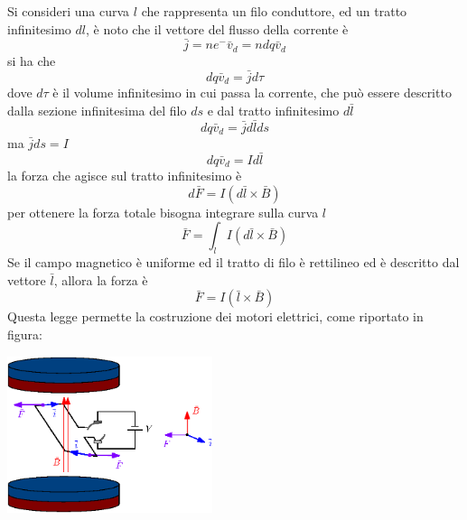 \documentclass[10pt, letterpaper]{report}
\begin{document}
Si consideri una curva $l$ che rappresenta un filo conduttore, ed un tratto infinitesimo $d l$, è noto che il vettore del flusso della corrente è 
$$ \bar j =ne^-\bar v_d= ndq\bar v_d$$
si ha che 
$$ dq\bar v_d=\bar jd\tau$$
dove $d\tau$ è il volume infinitesimo in cui passa la corrente, che può essere descritto dalla sezione infinitesima del filo $ds$ e dal tratto infinitesimo $d\bar l$ 
$$dq\bar v_d=\bar j d\bar lds $$
ma $\bar j ds =I$
$$ dq\bar v_d=Id\bar l$$
la forza che agisce sul tratto infinitesimo è 
$$ d\bar F =I(d\bar l\times \bar B)$$
per ottenere la forza totale bisogna integrare sulla curva $l$
$$ \bar F = \int_lI(d\bar l\times \bar B )$$
Se il campo magnetico è uniforme ed il tratto di filo è rettilineo ed è descritto dal vettore $\bar l$, allora la forza è 
$$ \bar F = I(\bar l\times \bar B)$$
Questa legge permette la costruzione dei motori elettrici, come riportato in figura:
\begin{center}
    \includegraphics[width=0.45\textwidth ]{images/motore2.eps}
\end{center}
\end{document}
